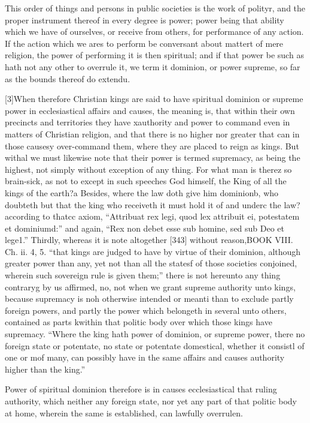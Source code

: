 This order of things and persons in public societies is the work of polityr, and the proper instrument thereof in every degree is power; power being that ability which we have of ourselves, or receive from others, for performance of any action. If the action which we ares to perform be conversant about mattert of mere religion, the power of performing it is then spiritual; and if that power be such as hath not any other to overrule it, we term it dominion, or power supreme, so far as the bounds thereof do extendu.

[3]When therefore Christian kings are said to have spiritual dominion or supreme power in ecclesiastical affairs and causes, the meaning is, that within their own precincts and territories they have xauthority and power to command even in matters of Christian religion, and that there is no higher nor greater that can in those causesy over-command them, where they are placed to reign as kings. But withal we must likewise note that their power is termed supremacy, as being the highest, not simply without exception of any thing. For what man is therez so brain-sick, as not to except in such speeches God himself, the King of all the kings of the earth?a Besides, where the law doth give him dominionb, who doubteth but that the king who receiveth it must hold it of and underc the law? according to thatcc axiom, “Attribuat rex legi, quod lex attribuit ei, potestatem et dominiumd:” and again, “Rex non debet esse sub homine, sed sub Deo et lege1.” Thirdly, whereas it is note altogether [343] without reason,BOOK VIII. Ch. ii. 4, 5. “that kings are judged to have by virtue of their dominion, although greater power than any, yet not than all the statesf of those societies conjoined, wherein such sovereign rule is given them;” there is not hereunto any thing contraryg by us affirmed, no, not when we grant supreme authority unto kings, because supremacy is noh otherwise intended or meanti than to exclude partly foreign powers, and partly the power which belongeth in several unto others, contained as parts kwithin that politic body over which those kings have supremacy. “Where the king hath power of dominion, or supreme power, there no foreign state or potentate, no state or potentate domestical, whether it consistl of one or mof many, can possibly have in the same affairs and causes authority higher than the king.”

Power of spiritual dominion therefore is in causes ecclesiastical that ruling authority, which neither any foreign state, nor yet any part of that politic body at home, wherein the same is established, can lawfully overrulen.

